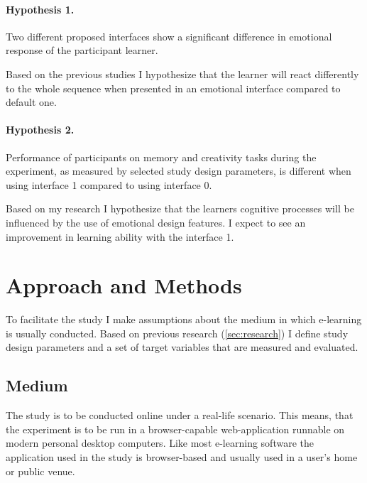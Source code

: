 		\paragraph{Hypothesis 1.} Two different proposed interfaces show a significant difference in emotional response of the participant learner.
		
		Based on the previous studies I hypothesize that the learner will react differently to the whole sequence when presented in an emotional interface compared to default one.
		
		
		\paragraph{Hypothesis 2.} Performance of participants on memory and creativity tasks during the experiment, as measured by selected study design parameters, is different when using interface 1 compared to using interface 0.
		
		Based on my research I hypothesize that the learners cognitive processes will be influenced by the use of emotional design features. I expect to see an improvement in learning ability with the interface 1.
		

\section{Approach and Methods}

To facilitate the study I make assumptions about the medium in which e-learning is usually conducted. Based on previous research (\ref{sec:research}) I define study design parameters and a set of target variables that are measured and evaluated.

	\subsection{Medium}
	
	The study is to be conducted online under a real-life scenario. This means, that the experiment is to be run in a browser-capable web-application runnable on modern personal desktop computers. Like most e-learning software the  application used in the study is browser-based and usually used in a user's home or public venue.
	
